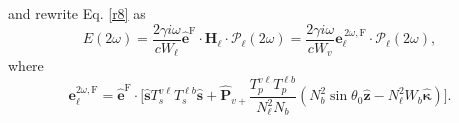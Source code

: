 and rewrite Eq. \eqref{r8} as
\begin{equation}\label{r10}
E(2\omega) =
\frac{2\gamma i \omega}{cW_{\ell}}
\hat{\mathbf{e}}^{\mathrm{F}}
\cdot
\mathbf{H}_{\ell}
\cdot
\boldsymbol{\mathcal{P}}_\ell(2\omega) 
= \frac{2\gamma i \omega}{cW_{v}}
\mathbf{e}^{\,2\omega,\mathrm{F}}_{\ell}
\cdot\boldsymbol{\mathcal{P}}_\ell(2\omega),
\end{equation}
where
\begin{equation}\label{r12mm}
\mathbf{e}^{2\omega,\mathrm{F}}_{\ell} =
\hat{\mathbf{e}}^{\mathrm{F}}\cdot 
\Bigg[
\hat{\mathbf{s}}T_{s}^{v\ell}T_{s}^{\ell b}\hat{\mathbf{s}} + 
\hat{\mathbf{P}}_{v+}
\frac{T^{v\ell}_{p}T^{\ell b}_{p}}
     {N^{2}_{\ell}N_{b}}
\left(
  N^{2}_{b}\sin\theta_{0}\hat{\mathbf{z}}
- N^{2}_{\ell}W_{b}\hat{\boldsymbol{\kappa}}
\right)
\Bigg].
\end{equation}

